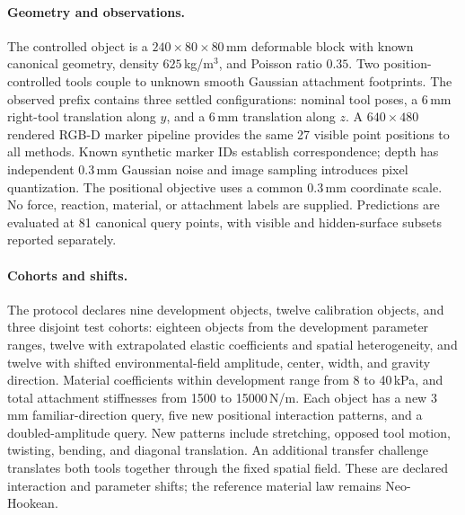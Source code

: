 \paragraph{Geometry and observations.}
The controlled object is a $240\times80\times80$\,mm deformable block with known canonical geometry, density $625$\,kg/m$^3$, and Poisson ratio $0.35$. Two position-controlled tools couple to unknown smooth Gaussian attachment footprints. The observed prefix contains three settled configurations: nominal tool poses, a 6\,mm right-tool translation along $y$, and a 6\,mm translation along $z$. A $640\times480$ rendered RGB-D marker pipeline provides the same 27 visible point positions to all methods. Known synthetic marker IDs establish correspondence; depth has independent 0.3\,mm Gaussian noise and image sampling introduces pixel quantization. The positional objective uses a common 0.3\,mm coordinate scale. No force, reaction, material, or attachment labels are supplied. Predictions are evaluated at 81 canonical query points, with visible and hidden-surface subsets reported separately.

\paragraph{Cohorts and shifts.}
The protocol declares nine development objects, twelve calibration objects, and three disjoint test cohorts: eighteen objects from the development parameter ranges, twelve with extrapolated elastic coefficients and spatial heterogeneity, and twelve with shifted environmental-field amplitude, center, width, and gravity direction. Material coefficients within development range from 8 to 40\,kPa, and total attachment stiffnesses from 1500 to 15000\,N/m. Each object has a new 3\,mm familiar-direction query, five new positional interaction patterns, and a doubled-amplitude query. New patterns include stretching, opposed tool motion, twisting, bending, and diagonal translation. An additional transfer challenge translates both tools together through the fixed spatial field. These are declared interaction and parameter shifts; the reference material law remains Neo-Hookean.





